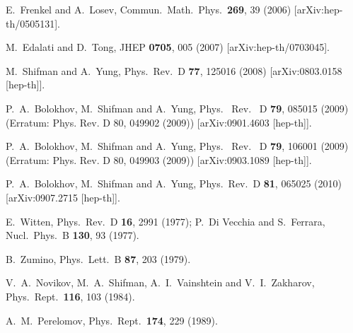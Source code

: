 \documentclass[epsfig,12pt]{article}
\begin{document}
\begin{thebibliography}{99}
  E.~Frenkel and A.~Losev,
  Commun.\ Math.\ Phys.\  {\bf 269}, 39 (2006)
  [arXiv:hep-th/0505131].
  
  M.~Edalati and D.~Tong,
  JHEP {\bf 0705}, 005 (2007)
  [arXiv:hep-th/0703045].
  
  M.~Shifman and A.~Yung,
  Phys.\ Rev.\  D {\bf 77}, 125016 (2008)
  [arXiv:0803.0158 [hep-th]].
  
  P.~A.~Bolokhov, M.~Shifman and A.~Yung,
  Phys. \ Rev. \ D {\bf 79}, 085015 (2009) (Erratum: Phys. Rev. D 80, 049902 (2009))
  [arXiv:0901.4603 [hep-th]].
  
  P.~A.~Bolokhov, M.~Shifman and A.~Yung,
  Phys. \ Rev. \ D {\bf 79}, 106001 (2009) (Erratum: Phys. Rev. D 80, 049903 (2009))
  [arXiv:0903.1089 [hep-th]].
  
  P.~A.~Bolokhov, M.~Shifman and A.~Yung,
  Phys.\ Rev.\  D {\bf 81}, 065025 (2010)
  [arXiv:0907.2715 [hep-th]].
  
  E.~Witten,
  Phys.\ Rev.\  D {\bf 16}, 2991 (1977);
  P.~Di Vecchia and S.~Ferrara,
  Nucl.\ Phys.\  B {\bf 130}, 93 (1977).

  B.~Zumino,
  Phys.\ Lett.\  B {\bf 87}, 203 (1979).

  V.~A.~Novikov, M.~A.~Shifman, A.~I.~Vainshtein and V.~I.~Zakharov,
  Phys.\ Rept.\  {\bf 116}, 103 (1984).
   
  A.~M.~Perelomov,
  Phys.\ Rept.\  {\bf 174}, 229 (1989).
  

\end{thebibliography}
\end{document}
